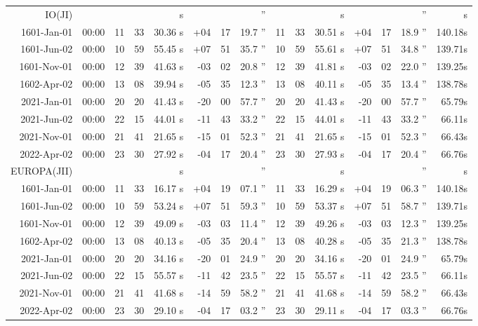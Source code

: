 \begin{longtable}{r@{\,}r|r@{h\,}r@{m\,}r<{s}|r@{°\,}r@{'\,}r<{''}||r@{h\,}r@{m\,}r<{s}|r@{°\,}r@{'\,}r<{''}r<{s}}
IO(JI)    \\
 1601-Jan-01 & 00:00  &   11 & 33 & 30.36 & +04 & 17 & 19.7 & 11&33&30.51 & +04&17&18.9 & 140.18\\ %
 1601-Jun-02 & 00:00  &   10 & 59 & 55.45 & +07 & 51 & 35.7 & 10&59&55.61 & +07&51&34.8 & 139.71\\ %
 1601-Nov-01 & 00:00  &   12 & 39 & 41.63 & -03 & 02 & 20.8 & 12&39&41.81 & -03&02&22.0 & 139.25\\ %
 1602-Apr-02 & 00:00  &   13 & 08 & 39.94 & -05 & 35 & 12.3 & 13&08&40.11 & -05&35&13.4 & 138.78\\ %
 2021-Jan-01 & 00:00  &   20 & 20 & 41.43 & -20 & 00 & 57.7 & 20&20&41.43 & -20&00&57.7 & 65.79\\ %
 2021-Jun-02 & 00:00  &   22 & 15 & 44.01 & -11 & 43 & 33.2 & 22&15&44.01 & -11&43&33.2 & 66.11\\ %
 2021-Nov-01 & 00:00  &   21 & 41 & 21.65 & -15 & 01 & 52.3 & 21&41&21.65 & -15&01&52.3 & 66.43\\ %
 2022-Apr-02 & 00:00  &   23 & 30 & 27.92 & -04 & 17 & 20.4 & 23&30&27.93 & -04&17&20.4 & 66.76\\ %
EUROPA(JII)      \\
 1601-Jan-01 & 00:00  &   11 & 33 & 16.17 & +04 & 19 & 07.1 & 11&33&16.29 & +04&19&06.3 & 140.18\\ %
 1601-Jun-02 & 00:00  &   10 & 59 & 53.24 & +07 & 51 & 59.3 & 10&59&53.37 & +07&51&58.7 & 139.71\\ %
 1601-Nov-01 & 00:00  &   12 & 39 & 49.09 & -03 & 03 & 11.4 & 12&39&49.26 & -03&03&12.3 & 139.25\\ %
 1602-Apr-02 & 00:00  &   13 & 08 & 40.13 & -05 & 35 & 20.4 & 13&08&40.28 & -05&35&21.3 & 138.78\\ %
 2021-Jan-01 & 00:00  &   20 & 20 & 34.16 & -20 & 01 & 24.9 & 20&20&34.16 & -20&01&24.9 & 65.79\\ %
 2021-Jun-02 & 00:00  &   22 & 15 & 55.57 & -11 & 42 & 23.5 & 22&15&55.57 & -11&42&23.5 & 66.11\\ %
 2021-Nov-01 & 00:00  &   21 & 41 & 41.68 & -14 & 59 & 58.2 & 21&41&41.68 & -14&59&58.2 & 66.43\\ %
 2022-Apr-02 & 00:00  &   23 & 30 & 29.10 & -04 & 17 & 03.2 & 23&30&29.11 & -04&17&03.3 & 66.76\\ %

\end{longtable}
